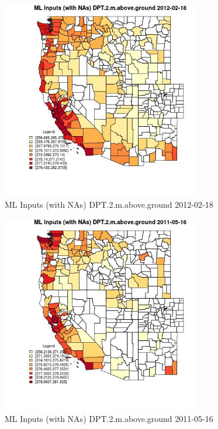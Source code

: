 \begin{figure} 
\centering  
\includegraphics[width=0.77\textwidth]{Code_Outputs/Report_ML_input_PM25_Step4_part_f_de_duplicated_aveswNAs_CountyDPT2mabovegroundMean2012-02-18.jpg} 
\caption{\label{fig:Report_ML_input_PM25_Step4_part_f_de_duplicated_aveswNAsCountyDPT2mabovegroundMean2012-02-18}ML Inputs (with NAs) DPT.2.m.above.ground 2012-02-18} 
\end{figure} 
 

\begin{figure} 
\centering  
\includegraphics[width=0.77\textwidth]{Code_Outputs/Report_ML_input_PM25_Step4_part_f_de_duplicated_aveswNAs_CountyDPT2mabovegroundMean2011-05-16.jpg} 
\caption{\label{fig:Report_ML_input_PM25_Step4_part_f_de_duplicated_aveswNAsCountyDPT2mabovegroundMean2011-05-16}ML Inputs (with NAs) DPT.2.m.above.ground 2011-05-16} 
\end{figure} 
 

